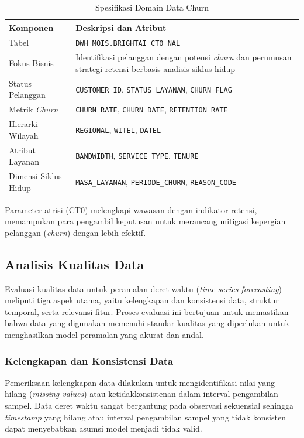 \begin{table}[htbp]
\centering
\caption{Spesifikasi Domain Data Churn}
\label{tab:spesifikasi-churn}
\begin{tabular}{|p{4cm}|p{9cm}|}
\hline
\textbf{Komponen} & \textbf{Deskripsi dan Atribut} \\
\hline
Tabel & \texttt{DWH\_MOIS.BRIGHTAI\_CT0\_NAL} \\
\hline
Fokus Bisnis & Identifikasi pelanggan dengan potensi \textit{churn} dan perumusan strategi retensi berbasis analisis siklus hidup \\
\hline
Status Pelanggan & \texttt{CUSTOMER\_ID}, \texttt{STATUS\_LAYANAN}, \texttt{CHURN\_FLAG} \\
\hline
Metrik \textit{Churn} & \texttt{CHURN\_RATE}, \texttt{CHURN\_DATE}, \texttt{RETENTION\_RATE} \\
\hline
Hierarki Wilayah & \texttt{REGIONAL}, \texttt{WITEL}, \texttt{DATEL} \\
\hline
Atribut Layanan & \texttt{BANDWIDTH}, \texttt{SERVICE\_TYPE}, \texttt{TENURE} \\
\hline
Dimensi Siklus Hidup & \texttt{MASA\_LAYANAN}, \texttt{PERIODE\_CHURN}, \texttt{REASON\_CODE} \\
\hline
\end{tabular}
\end{table}

Parameter atrisi (CT0) melengkapi wawasan dengan indikator retensi, memampukan para pengambil keputusan untuk merancang mitigasi kepergian pelanggan (\textit{churn}) dengan lebih efektif.

\subsection{Analisis Kualitas Data}
\label{subsec:kualitas-data}

Evaluasi kualitas data untuk peramalan deret waktu (\textit{time series forecasting}) meliputi tiga aspek utama, yaitu kelengkapan dan konsistensi data, struktur temporal, serta relevansi fitur. Proses evaluasi ini bertujuan untuk memastikan bahwa data yang digunakan memenuhi standar kualitas yang diperlukan untuk menghasilkan model peramalan yang akurat dan andal.

\subsubsection{Kelengkapan dan Konsistensi Data}

Pemeriksaan kelengkapan data dilakukan untuk mengidentifikasi nilai yang hilang (\textit{missing values}) atau ketidakkonsistenan dalam interval pengambilan sampel. Data deret waktu sangat bergantung pada observasi sekuensial sehingga \textit{timestamp} yang hilang atau interval pengambilan sampel yang tidak konsisten dapat menyebabkan asumsi model menjadi tidak valid.

